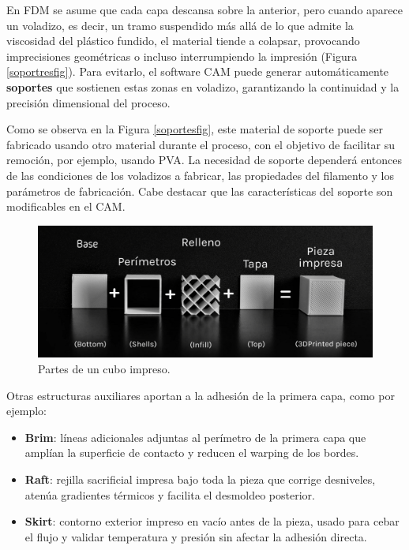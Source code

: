En FDM se asume que cada capa descansa sobre la anterior, pero cuando aparece un voladizo, es decir, un tramo suspendido más allá de lo que admite la viscosidad del plástico fundido, el material tiende a colapsar, provocando imprecisiones geométricas o incluso interrumpiendo la impresión (Figura \ref{soportresfig}). Para evitarlo, el software CAM puede generar automáticamente \textbf{soportes} que sostienen estas zonas en voladizo, garantizando la continuidad y la precisión dimensional del proceso.

Como se observa en la Figura \ref{soportesfig}, este material de soporte puede ser fabricado usando otro material durante el proceso, con el objetivo de facilitar su remoción, por ejemplo, usando PVA. La necesidad de soporte dependerá entonces de las condiciones de los voladizos a fabricar, las propiedades del filamento y los parámetros de fabricación. Cabe destacar que las características del soporte son modificables en el CAM.

\begin{figure}[h!]
	\centering
	\includegraphics[width=0.8\linewidth]{imgs/morfo.png}
	\caption{Partes de un cubo impreso.}
	\label{morfofig}
\end{figure} 

Otras estructuras auxiliares aportan a la adhesión de la primera capa, como por ejemplo:

\begin{itemize}
  \item \textbf{Brim}: líneas adicionales adjuntas al perímetro de la primera capa que amplían la superficie de contacto y reducen el warping de los bordes.  
  \item \textbf{Raft}: rejilla sacrificial impresa bajo toda la pieza que corrige desniveles, atenúa gradientes térmicos y facilita el desmoldeo posterior.  
  \item \textbf{Skirt}: contorno exterior impreso en vacío antes de la pieza, usado para cebar el flujo y validar temperatura y presión sin afectar la adhesión directa.  
\end{itemize}

